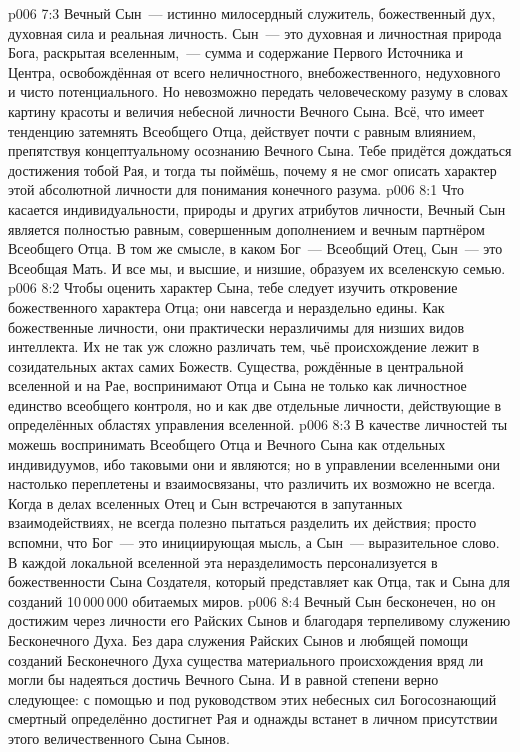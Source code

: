 \vs p006 7:3 Вечный Сын~--- истинно милосердный служитель, божественный дух, духовная сила и реальная личность. Сын~--- это духовная и личностная природа Бога, раскрытая вселенным,~--- сумма и содержание Первого Источника и Центра, освобождённая от всего неличностного, внебожественного, недуховного и чисто потенциального. Но невозможно передать человеческому разуму в словах картину красоты и величия небесной личности Вечного Сына. Всё, что имеет тенденцию затемнять Всеобщего Отца, действует почти с равным влиянием, препятствуя концептуальному осознанию Вечного Сына. Тебе придётся дождаться достижения тобой Рая, и тогда ты поймёшь, почему я не смог описать характер этой абсолютной личности для понимания конечного разума.
\vs p006 8:1 Что касается индивидуальности, природы и других атрибутов личности, Вечный Сын является полностью равным, совершенным дополнением и вечным партнёром Всеобщего Отца. В том же смысле, в каком Бог~--- Всеобщий Отец, Сын~--- это Всеобщая Мать. И все мы, и высшие, и низшие, образуем их вселенскую семью.
\vs p006 8:2 Чтобы оценить характер Сына, тебе следует изучить откровение божественного характера Отца; они навсегда и нераздельно едины. Как божественные личности, они практически неразличимы для низших видов интеллекта. Их не так уж сложно различать тем, чьё происхождение лежит в созидательных актах самих Божеств. Существа, рождённые в центральной вселенной и на Рае, воспринимают Отца и Сына не только как личностное единство всеобщего контроля, но и как две отдельные личности, действующие в определённых областях управления вселенной.
\vs p006 8:3 В качестве личностей ты можешь воспринимать Всеобщего Отца и Вечного Сына как отдельных индивидуумов, ибо таковыми они и являются; но в управлении вселенными они настолько переплетены и взаимосвязаны, что различить их возможно не всегда. Когда в делах вселенных Отец и Сын встречаются в запутанных взаимодействиях, не всегда полезно пытаться разделить их действия; просто вспомни, что Бог~--- это инициирующая мысль, а Сын~--- выразительное слово. В каждой локальной вселенной эта неразделимость персонализуется в божественности Сына Создателя, который представляет как Отца, так и Сына для созданий 10\,000\,000 обитаемых миров.
\vs p006 8:4 Вечный Сын бесконечен, но он достижим через личности его Райских Сынов и благодаря терпеливому служению Бесконечного Духа. Без дара служения Райских Сынов и любящей помощи созданий Бесконечного Духа существа материального происхождения вряд ли могли бы надеяться достичь Вечного Сына. И в равной степени верно следующее: с помощью и под руководством этих небесных сил Богосознающий смертный определённо достигнет Рая и однажды встанет в личном присутствии этого величественного Сына Сынов.
